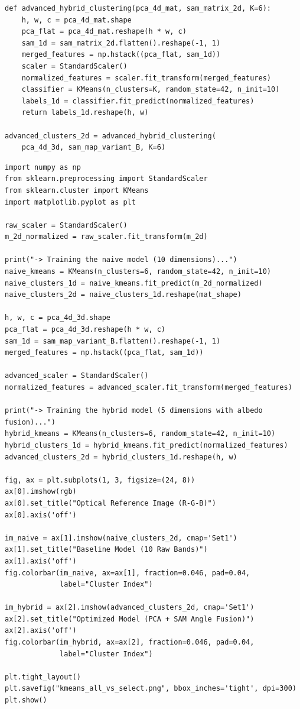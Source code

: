 \documentclass[12pt,a4paper]{article}
\begin{document}
\begin{lstlisting}[caption={Extended model: PC1--PC4 and SAM.},label={lst:kmeans-advanced}]
def advanced_hybrid_clustering(pca_4d_mat, sam_matrix_2d, K=6):
    h, w, c = pca_4d_mat.shape
    pca_flat = pca_4d_mat.reshape(h * w, c)
    sam_1d = sam_matrix_2d.flatten().reshape(-1, 1)
    merged_features = np.hstack((pca_flat, sam_1d))
    scaler = StandardScaler()
    normalized_features = scaler.fit_transform(merged_features)
    classifier = KMeans(n_clusters=K, random_state=42, n_init=10)
    labels_1d = classifier.fit_predict(normalized_features)
    return labels_1d.reshape(h, w)

advanced_clusters_2d = advanced_hybrid_clustering(
    pca_4d_3d, sam_map_variant_B, K=6)
\end{lstlisting}

\begin{lstlisting}[caption={Comparison of the baseline and hybrid models.},label={lst:ablation}]
import numpy as np
from sklearn.preprocessing import StandardScaler
from sklearn.cluster import KMeans
import matplotlib.pyplot as plt

raw_scaler = StandardScaler()
m_2d_normalized = raw_scaler.fit_transform(m_2d)

print("-> Training the naive model (10 dimensions)...")
naive_kmeans = KMeans(n_clusters=6, random_state=42, n_init=10)
naive_clusters_1d = naive_kmeans.fit_predict(m_2d_normalized)
naive_clusters_2d = naive_clusters_1d.reshape(mat_shape)

h, w, c = pca_4d_3d.shape
pca_flat = pca_4d_3d.reshape(h * w, c)
sam_1d = sam_map_variant_B.flatten().reshape(-1, 1)
merged_features = np.hstack((pca_flat, sam_1d))

advanced_scaler = StandardScaler()
normalized_features = advanced_scaler.fit_transform(merged_features)

print("-> Training the hybrid model (5 dimensions with albedo fusion)...")
hybrid_kmeans = KMeans(n_clusters=6, random_state=42, n_init=10)
hybrid_clusters_1d = hybrid_kmeans.fit_predict(normalized_features)
advanced_clusters_2d = hybrid_clusters_1d.reshape(h, w)

fig, ax = plt.subplots(1, 3, figsize=(24, 8))
ax[0].imshow(rgb)
ax[0].set_title("Optical Reference Image (R-G-B)")
ax[0].axis('off')

im_naive = ax[1].imshow(naive_clusters_2d, cmap='Set1')
ax[1].set_title("Baseline Model (10 Raw Bands)")
ax[1].axis('off')
fig.colorbar(im_naive, ax=ax[1], fraction=0.046, pad=0.04,
             label="Cluster Index")

im_hybrid = ax[2].imshow(advanced_clusters_2d, cmap='Set1')
ax[2].set_title("Optimized Model (PCA + SAM Angle Fusion)")
ax[2].axis('off')
fig.colorbar(im_hybrid, ax=ax[2], fraction=0.046, pad=0.04,
             label="Cluster Index")

plt.tight_layout()
plt.savefig("kmeans_all_vs_select.png", bbox_inches='tight', dpi=300)
plt.show()
\end{lstlisting}
\end{document}
